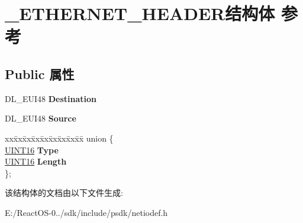 \hypertarget{struct___e_t_h_e_r_n_e_t___h_e_a_d_e_r}{}\section{\+\_\+\+E\+T\+H\+E\+R\+N\+E\+T\+\_\+\+H\+E\+A\+D\+E\+R结构体 参考}
\label{struct___e_t_h_e_r_n_e_t___h_e_a_d_e_r}
\subsection*{Public 属性}
\begin{DoxyCompactItemize}
\item 
\mbox{\label{struct___e_t_h_e_r_n_e_t___h_e_a_d_e_r_a11e8d819ad3415ddb9d14d922e6edd2f}} 
D\+L\+\_\+\+E\+U\+I48 {\bfseries Destination}
\item 
\mbox{\label{struct___e_t_h_e_r_n_e_t___h_e_a_d_e_r_a82adc3c968eb79010827e52a47c5149f}} 
D\+L\+\_\+\+E\+U\+I48 {\bfseries Source}
\item 
\mbox{\label{struct___e_t_h_e_r_n_e_t___h_e_a_d_e_r_a01841171d55d60fb0a0f84e6f1ae2f6c}} 
\begin{tabbing}
xx\=xx\=xx\=xx\=xx\=xx\=xx\=xx\=xx\=\kill
union \{\\
\>\hyperlink{_processor_bind_8h_a09f1a1fb2293e33483cc8d44aefb1eb1}{UINT16} {\bfseries Type}\\
\>\hyperlink{_processor_bind_8h_a09f1a1fb2293e33483cc8d44aefb1eb1}{UINT16} {\bfseries Length}\\
\}; \\

\end{tabbing}\end{DoxyCompactItemize}


该结构体的文档由以下文件生成\+:\begin{DoxyCompactItemize}
\item 
E\+:/\+React\+O\+S-\/0../sdk/include/psdk/netiodef.\+h\end{DoxyCompactItemize}
